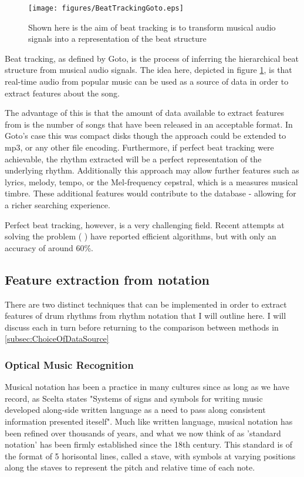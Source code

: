 \documentclass[12pt,twoside,notitlepage]{report}
\begin{document}
		\begin{figure}[h]
			\centerline{\texttt{[image: figures/BeatTrackingGoto.eps]}}
			\caption{\label{beatTracking} Shown here is the aim of beat tracking is to transform musical audio signals into a representation of the beat structure\cite{Goto2001}}
\end{figure}

		Beat tracking, as defined by Goto\cite{Goto2001}, is the process of inferring the hierarchical beat structure from musical audio signals. The idea here, depicted in figure \ref{beatTracking}, is that real-time audio from popular music can be used as a source of data in order to extract features about the song. 
		
		The advantage of this is that the amount of data available to extract features from is the number of songs that have been released in an acceptable format. In Goto's case this was compact disks though the approach could be extended to mp3, or any other file encoding. Furthermore, if perfect beat tracking were achievable, the rhythm extracted will be a perfect representation of the underlying rhythm. Additionally this approach may allow further features such as lyrics, melody, tempo, or the Mel-frequency cepstral, which is a measures musical timbre. These additional features would contribute to the database - allowing for a richer searching experience.
		
		Perfect beat tracking, however, is a very challenging field. Recent attempts at solving the problem (\cite{Ellis2007} \cite{EllisPoliner2007} \cite{DaviesPlumbley2007}) have reported efficient algorithms, but with only an accuracy of around 60\%.
		\subsection{Feature extraction from notation}
		There are two distinct techniques that can be implemented in order to extract features of drum rhythms from rhythm notation that I will outline here. I will discuss each in turn before returning to the comparison between methods in \ref{subsec:ChoiceOfDataSource}
			\subsubsection{Optical Music Recognition}
			
		Musical notation has been a practice in many cultures since as long as we have record, as Scelta states\cite{Scelta} "Systems of signs and symbols for writing music developed along-side written language as a need to pass along consistent information presented iteself". Much like written language, musical notation has been refined over thousands of years, and what we now think of as 'standard notation' has been firmly established since the 18th century\cite{Scelta}. This standard is of the format of 5 horisontal lines, called a stave, with symbols at varying positions along the staves to represent the pitch and relative time of each note.
		
\end{document}
